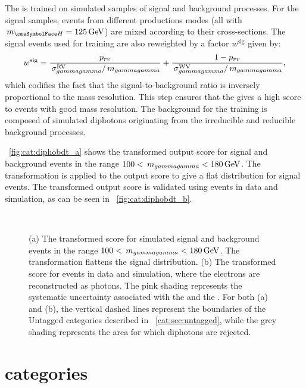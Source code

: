 The \DiPhoBdt is trained on simulated samples of signal and background processes. For the signal samples, events from different productions modes (all with $\mH=125\GeV$) are mixed according to their \SM cross-sections. The signal events used for training are also reweighted by a factor $w^{\text{sig}}$ given by: 
\begin{equation}
w^{\text{sig}}= \frac{p_{rv}}{\,\sigma^\text{RV}_{gammagamma}/\,m_{gammagamma}}+\frac{1-p_{rv}}{\,\sigma^\text{WV}_{gammagamma}/\,m_{gammagamma}},
\end{equation} 
which codifies the fact that the signal-to-background ratio is inversely proportional to the mass resolution. This step ensures that the \DiPhoBdt gives a high score to events with good mass resolution.
The background for the training is composed of simulated diphotons originating from the irreducible and reducible \SM background processes. 

\Fig~\ref{fig:cat:diphobdt_a} shows the transformed \DiPhoBdt output score for signal and background events in the range $100 < \,m_{gammagamma} < 180\,\text{Ge\hspace{-.08em}V}$. The transformation is applied to the \DiPhoBdt output score to give a flat distribution for signal events. The transformed \DiPhoBdt output score is validated using \Zee events in data and simulation, as can be seen in \Fig~\ref{fig:cat:diphobdt_b}.
\begin{figure}[hpt]
\centering
\\
\caption{ (a) The transformed \DiPhoBdt score for simulated signal and background events in the range $100 < \,m_{gammagamma} < 180\,\text{Ge\hspace{-.08em}V}$. The transformation flattens the signal distribution. (b) The transformed \DiPhoBdt score for \Zee events in data and simulation, where the electrons are reconstructed as photons. The pink shading represents the systematic uncertainty associated with the \PhoIdBdt and the \PhoEnergyBdt. For both (a) and (b), the vertical dashed lines represent the boundaries of the Untagged categories described in \Sec~\ref{cat:sec:untagged}, while the grey shading represents the area for which diphotons are rejected.}
\label{fig:cat:diphobdt}
\end{figure}

\section{\VBFTag categories }
\label{cat:sec:vbftag}

